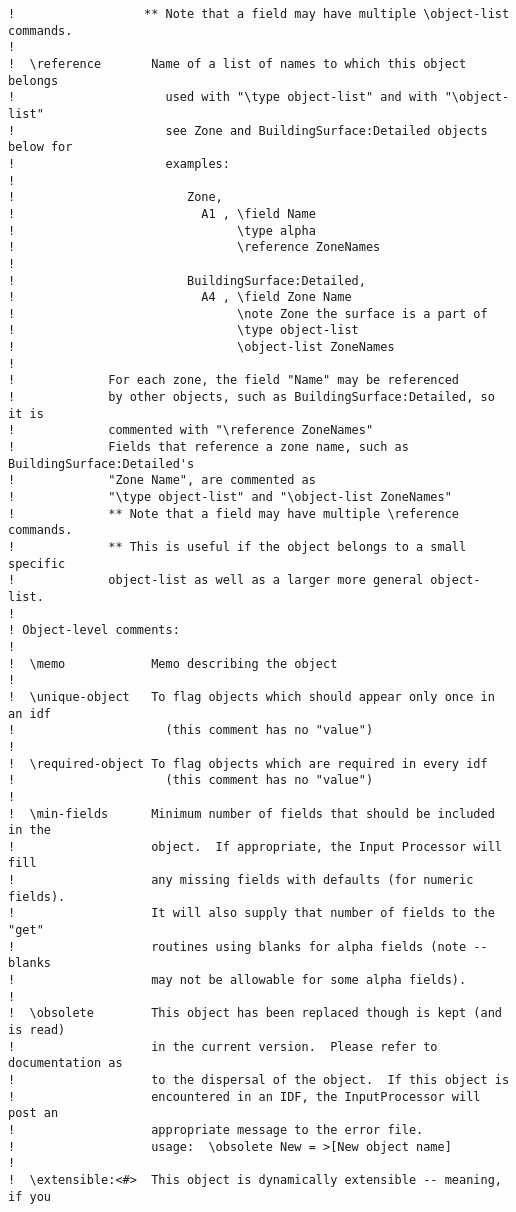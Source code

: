 \begin{lstlisting}
!                  ** Note that a field may have multiple \object-list commands.
!
!  \reference       Name of a list of names to which this object belongs
!                     used with "\type object-list" and with "\object-list"
!                     see Zone and BuildingSurface:Detailed objects below for
!                     examples:
!
!                        Zone,
!                          A1 , \field Name
!                               \type alpha
!                               \reference ZoneNames
!
!                        BuildingSurface:Detailed,
!                          A4 , \field Zone Name
!                               \note Zone the surface is a part of
!                               \type object-list
!                               \object-list ZoneNames
!
!             For each zone, the field "Name" may be referenced
!             by other objects, such as BuildingSurface:Detailed, so it is
!             commented with "\reference ZoneNames"
!             Fields that reference a zone name, such as BuildingSurface:Detailed's
!             "Zone Name", are commented as
!             "\type object-list" and "\object-list ZoneNames"
!             ** Note that a field may have multiple \reference commands.
!             ** This is useful if the object belongs to a small specific
!             object-list as well as a larger more general object-list.
!
! Object-level comments:
!
!  \memo            Memo describing the object
!
!  \unique-object   To flag objects which should appear only once in an idf
!                     (this comment has no "value")
!
!  \required-object To flag objects which are required in every idf
!                     (this comment has no "value")
!
!  \min-fields      Minimum number of fields that should be included in the
!                   object.  If appropriate, the Input Processor will fill
!                   any missing fields with defaults (for numeric fields).
!                   It will also supply that number of fields to the "get"
!                   routines using blanks for alpha fields (note -- blanks
!                   may not be allowable for some alpha fields).
!
!  \obsolete        This object has been replaced though is kept (and is read)
!                   in the current version.  Please refer to documentation as
!                   to the dispersal of the object.  If this object is
!                   encountered in an IDF, the InputProcessor will post an
!                   appropriate message to the error file.
!                   usage:  \obsolete New = >[New object name]
!
!  \extensible:<#>  This object is dynamically extensible -- meaning, if you

\end{lstlisting}
